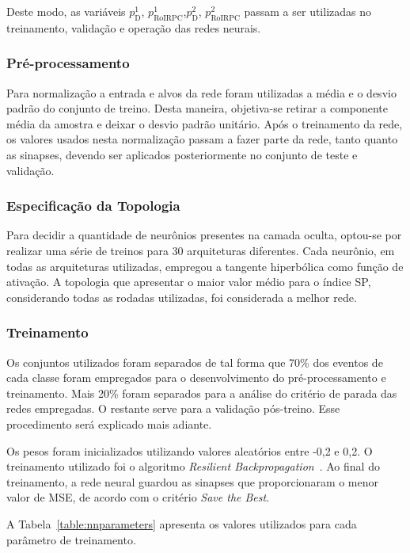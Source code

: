 Deste modo, as variáveis $p^1_\text{D}$, $p^1_\text{RoIRPC}$,$p^2_\text{D}$,
$p^2_\text{RoIRPC}$ passam a ser utilizadas no treinamento, validação e operação
das redes neurais.

\subsubsection{Pré-processamento}

Para normalização a entrada e alvos da rede foram utilizadas a média e o desvio
padrão do conjunto de treino. Desta maneira, objetiva-se retirar a componente
média da amostra e deixar o desvio padrão unitário. Após o treinamento da rede,
os valores usados nesta normalização passam a fazer parte da rede, tanto quanto
as sinapses, devendo ser aplicados posteriormente no conjunto de teste e
validação.


\subsubsection{Especificação da Topologia}

Para decidir a quantidade de neurônios presentes na camada oculta, optou-se por
realizar uma série de treinos para 30 arquiteturas diferentes. Cada neurônio,
em todas as arquiteturas utilizadas, empregou a tangente hiperbólica como
função de ativação. A topologia que apresentar o maior valor médio para o índice
SP, considerando todas as rodadas utilizadas, foi considerada a melhor rede.

\subsubsection{Treinamento}

Os conjuntos utilizados foram separados de tal forma que 70\% dos eventos de
cada classe foram empregados para o desenvolvimento do pré-processamento e
treinamento. Mais 20\% foram separados para a análise do critério de
parada das redes empregadas. O restante serve para a validação pós-treino. Esse
procedimento será explicado mais adiante.

Os pesos foram inicializados utilizando valores aleatórios entre -0,2 e 0,2. O
treinamento utilizado foi o algoritmo \emph{Resilient
Backpropagation}~\cite{RIEDMILLER1993}. Ao final do treinamento, a rede neural
guardou as sinapses que proporcionaram o menor valor de MSE, de acordo com o
critério \emph{Save the Best}.

A Tabela~\ref{table:nnparameters} apresenta os valores utilizados para cada
parâmetro de treinamento.


